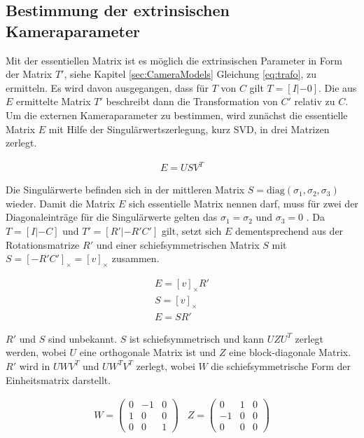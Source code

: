 \subsection{Bestimmung der extrinsischen Kameraparameter}


Mit der essentiellen Matrix ist es möglich die extrinsischen Parameter in Form der Matrix $T'$, siehe Kapitel \ref{sec:CameraModels} Gleichung \ref{eq:trafo}, zu ermitteln. Es wird davon ausgegangen, dass für $T$ von $C$ gilt $T = [I|-0]$. Die aus $E$ ermittelte Matrix $T'$ beschreibt dann die Transformation von $C'$ relativ zu $C$\cite{HZ,Ferid}. Um die externen Kameraparameter zu bestimmen, wird zunächst die essentielle Matrix \ensuremath{E} mit Hilfe der Singulärwertszerlegung, kurz SVD, in drei Matrizen zerlegt. 

\begin{gather}
E = US V^T
\end{gather}

Die Singulärwerte befinden sich in der mittleren Matrix $S = \text{diag}(\sigma_1,\sigma_2,\sigma_3)$ wieder. Damit die Matrix $E$ sich essentielle Matrix nennen darf, muss für zwei der Diagonaleinträge für die Singulärwerte gelten das $\sigma_1 = \sigma_2$ und $\sigma_3=0$ \cite{HZ,Ferid}. Da $T=[I|-C]$ und $T'=[R'|-R'C']$ gilt, setzt sich $E$ dementsprechend aus der Rotationsmatrize $R'$ und einer schiefsymmetrischen Matrix $S$ mit $S = [-R'C']_\times = [v]_\times$ zusammen\cite{HZ,phdextrinsicPara,Ferid}. 

\begin{gather}
E=[v]_\times R'\\
S =[v]_\times\\
E=SR'
\end{gather}

$R'$ und $S$ sind unbekannt. $S$ ist schiefsymmetrisch und kann $UZU^T$ zerlegt werden, wobei $U$ eine orthogonale Matrix ist und $Z$ eine block-diagonale Matrix\cite{HZ}. $R'$ wird in $UWV^T$ und $UW^TV^T$ zerlegt, wobei $W$ die schiefsymmetrische Form der Einheitsmatrix darstellt\cite{Ferid,HZ}.




\begin{gather}
W = \begin{pmatrix}
0&-1&0\\
1&0&0\\
0&0&1
\end{pmatrix} \;\;\;
Z=
\begin{pmatrix}
0&1&0\\
-1&0&0\\
0&0&0
\end{pmatrix}
\end{gather}

